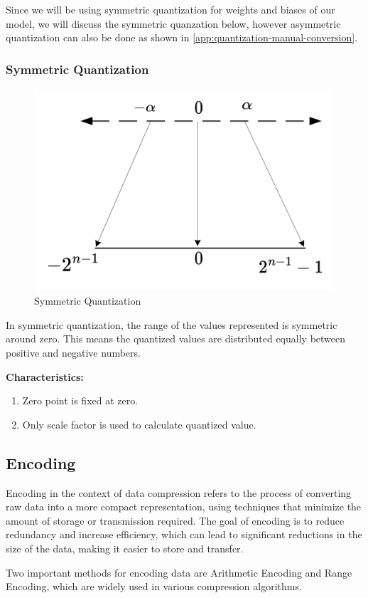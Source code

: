 \documentclass{ioereport}
\begin{document}
    Since we will be using symmetric quantization for weights and biases of our model, we will discuss the symmetric quanzation below, however asymmetric quantization can also be done as shown in \autoref{app:quantization-manual-conversion}.
    \subsubsection{Symmetric Quantization} 
    \begin{figure}[H]
        \centering
        \includegraphics[width=0.7\linewidth]{assets/quantization/Symmetric_Qfigure.png}
        \caption{Symmetric Quantization}
        \label{fig:Symmetric_Qfigure}
    \end{figure}
    In symmetric quantization, the range of the values represented is symmetric around zero. This means the quantized values are distributed equally between positive and negative numbers.

    \textbf{Characteristics:}
    \begin{enumerate}
        \item Zero point is fixed at zero.
        \item Only scale factor is used to calculate quantized value.
    \end{enumerate}

    \subsection{Encoding}
    Encoding in the context of data compression refers to the process of converting raw data into a more compact representation, using techniques that minimize the amount of storage or transmission required. The goal of encoding is to reduce redundancy and increase efficiency, which can lead to significant reductions in the size of the data, making it easier to store and transfer.

    Two important methods for encoding data are Arithmetic Encoding and Range Encoding, which are widely used in various compression algorithms.
\end{document}
